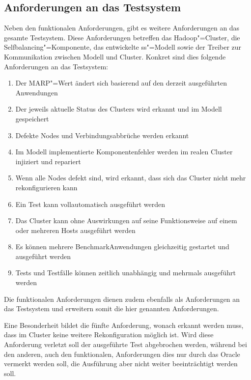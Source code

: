 \subsection{Anforderungen an das Testsystem}
\label{subsec:testRequirements}

Neben den funktionalen Anforderungen, gibt es weitere Anforderungen an das gesamte Testsystem.
Diese Anforderungen betreffen das Hadoop"=Cluster, die Selfbalancing"=Komponente, das entwickelte \gls{ss}"=Modell sowie der Treiber zur Kommunikation zwischen Modell und Cluster.
Konkret sind dies folgende Anforderungen an das Testsystem:

\begin{enumerate}
    \item Der \gls{MARP}"=Wert ändert sich basierend auf den derzeit ausgeführten Anwendungen
    \item Der jeweils aktuelle Status des Clusters wird erkannt und im Modell gespeichert
    \item Defekte Nodes und Verbindungsabbrüche werden erkannt
    \item Im Modell implementierte Komponentenfehler werden im realen Cluster injiziert und repariert
    \item Wenn alle Nodes defekt sind, wird erkannt, dass sich das Cluster nicht mehr rekonfigurieren kann
    \item Ein Test kann vollautomatisch ausgeführt werden
    \item Das Cluster kann ohne Auswirkungen auf seine Funktionsweise auf einem oder mehreren Hosts ausgeführt werden
    \item Es können mehrere BenchmarkAnwendungen gleichzeitig gestartet und ausgeführt werden
    \item Tests und Testfälle können zeitlich unabhängig und mehrmals ausgeführt werden
\end{enumerate}

Die funktionalen Anforderungen dienen zudem ebenfalls als Anforderungen an das Testsystem und erweitern somit die hier genannten Anforderungen.

Eine Besonderheit bildet die fünfte Anforderung, wonach erkannt werden muss, dass im Cluster keine weitere Rekonfiguration möglich ist.
Wird diese Anforderung verletzt soll der ausgeführte Test abgebrochen werden, während bei den anderen, auch den funktionalen, Anforderungen dies nur durch das Oracle vermerkt werden soll, die Ausführung aber nicht weiter beeinträchtigt werden soll.
